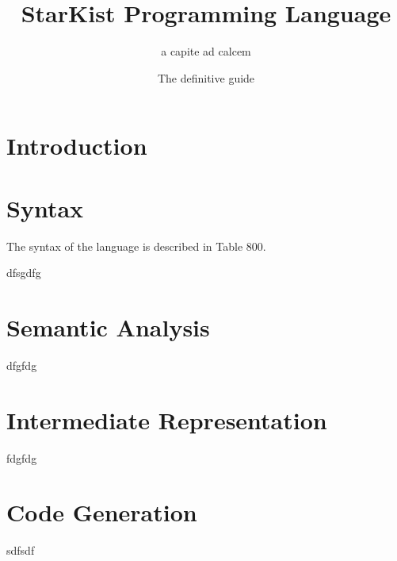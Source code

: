 \documentclass{article}
\title{StarKist Programming Language}
\author{a capite ad calcem}
\date{The definitive guide}
\begin{document}
\maketitle
\section{Introduction}

\section*{Syntax}
The syntax of the language is described in Table 800.

dfsgdfg
\section{Semantic Analysis}
dfgfdg
\section{Intermediate Representation}
fdgfdg
\section{Code Generation}
sdfsdf
\end{document}
